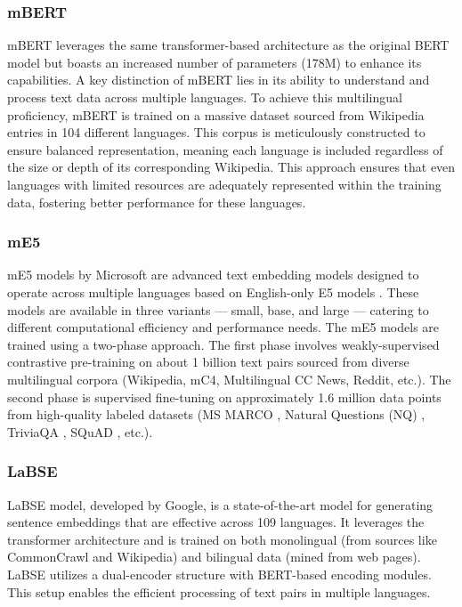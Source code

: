 \subsubsection{mBERT}
\ac{mBERT} \cite{bert_mbert} leverages the same transformer-based architecture as the original \ac{BERT} model but boasts an increased number of parameters (178M) to enhance its capabilities.
A key distinction of \ac{mBERT} lies in its ability to understand and process text data across multiple languages.
To achieve this multilingual proficiency, \ac{mBERT} is trained on a massive dataset sourced from Wikipedia entries in 104 different languages.
This corpus is meticulously constructed to ensure balanced representation, meaning each language is included regardless of the size or depth of its corresponding Wikipedia.
This approach ensures that even languages with limited resources are adequately represented within the training data, fostering better performance for these languages.

\subsubsection{\ac{mE5} \cite{mE5}}
\ac{mE5} models by Microsoft are advanced text embedding models designed to operate across multiple languages based on English-only E5 models \cite{E5}.
These models are available in three variants — small, base, and large — catering to different computational efficiency and performance needs.
The \ac{mE5} models are trained using a two-phase approach.
The first phase involves weakly-supervised contrastive pre-training on about 1 billion text pairs sourced from diverse multilingual corpora (Wikipedia, mC4, Multilingual CC News, Reddit, etc.).
The second phase is supervised fine-tuning on approximately 1.6 million data points from high-quality labeled datasets (MS MARCO \cite{ms_marco_dataset}, Natural Questions (NQ) \cite{NQ_dataset}, TriviaQA \cite{TriviaQA}, SQuAD \cite{SQuAD}, etc.).

\subsubsection{LaBSE \cite{LaBSE}}
\ac{LaBSE} model, developed by Google, is a state-of-the-art model for generating sentence embeddings that are effective across 109 languages.
It leverages the transformer architecture and is trained on both monolingual (from sources like CommonCrawl and Wikipedia) and bilingual data (mined from web pages).
LaBSE utilizes a dual-encoder structure with \ac{BERT}-based encoding modules.
This setup enables the efficient processing of text pairs in multiple languages.

